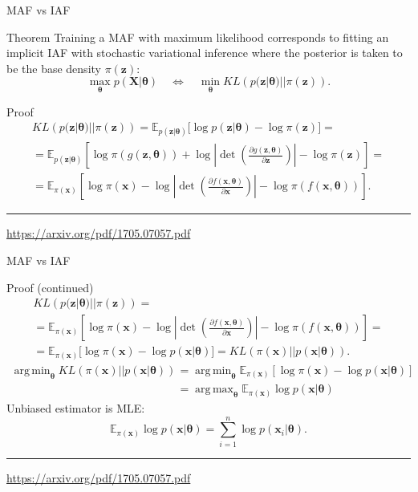 \documentclass{beamer}
\newcommand{\bx}{\mathbf{x}}
\newcommand{\bz}{\mathbf{z}}
\newcommand{\bX}{\mathbf{X}}
\newcommand{\btheta}{\boldsymbol{\theta}}
\DeclareMathOperator*{\argmin}{arg\,min}
\DeclareMathOperator*{\argmax}{arg\,max}
\begin{document}
\begin{frame}{MAF vs IAF}
	\begin{block}{Theorem}
		Training a MAF with maximum likelihood corresponds to fitting an implicit IAF  with stochastic variational inference where the posterior is taken to be the base density $\pi(\bz)$:
		\[  
		\max_{\btheta} p(\bX | \btheta) \quad \Leftrightarrow \quad \min_{\btheta} KL\left(p(\bz | \btheta) || \pi(\bz)\right).
		\]
		\vspace{-0.5cm}
	\end{block}
	\begin{block}{Proof}
		\vspace{-0.5cm}
		\begin{multline*}
			KL\left(p(\bz | \btheta) || \pi(\bz) \right) = \mathbb{E}_{p(\bz | \btheta)} \bigl[ \log p(\bz | \btheta) - \log \pi(\bz) \bigr] = \\ 
			= \mathbb{E}_{p(\bz | \btheta)} \left[ \log \pi(g(\bz, \btheta)) + \log \left| \det \left( \frac{\partial g(\bz, \btheta)}{\partial \bz}\right) \right| - \log \pi(\bz) \right] = \\
			= \mathbb{E}_{\pi(\bx)} \left[ \log \pi(\bx) - \log \left| \det \left( \frac{\partial f(\bx, \btheta)}{\partial \bx}\right) \right| - \log \pi(f(\bx, \btheta)) \right].
		\end{multline*}
	\end{block}
	\vfill
	\hrule\medskip
	{\scriptsize \href{https://arxiv.org/pdf/1705.07057.pdf}{https://arxiv.org/pdf/1705.07057.pdf}} 
\end{frame}
\begin{frame}{MAF vs IAF}
	\begin{block}{Proof (continued)}
		\vspace{-0.5cm}
		\begin{multline*}
			KL\left(p(\bz | \btheta) || \pi(\bz) \right) = \\
			=  \mathbb{E}_{\pi(\bx)} \left[ \log \pi(\bx) - \log \left| \det \left( \frac{\partial f(\bx, \btheta)}{\partial \bx}\right) \right| - \log \pi(f(\bx, \btheta)) \right] = \\
			= \mathbb{E}_{\pi(\bx)} \bigl[ \log \pi(\bx) - \log p(\bx | \btheta) \bigr] = KL (\pi(\bx) || p(\bx | \btheta)).
		\end{multline*}
		\begin{align*}
			\argmin_{\btheta}  KL (\pi(\bx) || p(\bx | \btheta)) &= \argmin_{\btheta} \mathbb{E}_{\pi(\bx)} \left[ \log \pi(\bx) - \log p(\bx | \btheta) \right] \\
			&= \argmax_{\btheta} \mathbb{E}_{\pi(\bx)} \log p(\bx | \btheta)
		\end{align*}
		Unbiased estimator is MLE:
		\vspace{-0.2cm}
		\[
		\mathbb{E}_{\pi(\bx)} \log p(\bx | \btheta) = \sum_{i=1}^n \log p(\bx_i | \btheta).
		\]
		\vspace{-0.3cm}
	\end{block}
	\vfill
	\hrule\medskip
	{\scriptsize \href{https://arxiv.org/pdf/1705.07057.pdf}{https://arxiv.org/pdf/1705.07057.pdf}} 
\end{frame}
\end{document}
